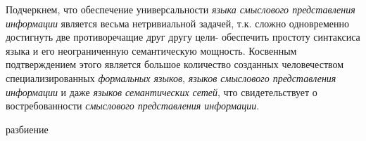 \begin{SCn}
\begin{scnsubstruct}
\begin{scnindent}
{Подчеркнем, что обеспечение универсальности \textit{языка смыслового представления информации} является весьма нетривиальной задачей, т.к. сложно одновременно достигнуть две противоречащие друг другу цели- обеспечить простоту синтаксиса языка и его неограниченную семантическую мощность. Косвенным подтверждением этого является большое количество созданных человечеством специализированных \textit{формальных языков}, \textit{языков смыслового представления информации} и даже \textit{языков семантических сетей}, что свидетельствует о востребованности \textit{смыслового представления информации}.}
\begin{scnrelfromset}{разбиение}
\begin{scnindent}
\end{scnindent}
\begin{scnindent}
\end{scnindent}
\end{scnrelfromset}
\bigskip
\scnfragmentcaption


\begin{scnindent}
\end{scnindent}
\begin{scnindent}
\end{scnindent}


\end{scnindent}
\end{scnsubstruct}
\end{SCn}
